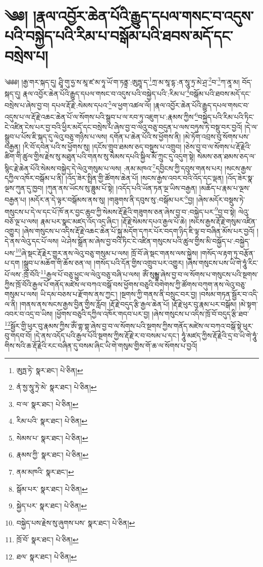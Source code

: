 \setcounter{footnote}{0} 
\chapter{༄༅། །རྣལ་འབྱོར་ཆེན་པོའི་རྒྱུད་དཔལ་གསང་བ་འདུས་པའི་བསྐྱེད་པའི་རིམ་པ་བསྒོམ་པའི་ཐབས་མདོ་དང་བསྲེས་པ།}༄༅༅། །རྒྱ་གར་སྐད་དུ། ཤྲཱི་གུ་ཧྱ་ས་མཱ་ཛ་མ་ཧཱ་ཡོ་ག་ཏནྟྲ་:ཨུཏྤཱ་ད་\footnote{ཨུཏྤ་ཏེ་  སྣར་ཐང་།  པེ་ཅིན། }ཀྲ་མ་སཱ་དྷ་:ན་སཱུ་ཏྲ་མེ་ཤྲ་\footnote{ནཾ་སྱ་སཱུ་ཏྲེ་མེ་  སྣར་ཐང་།  པེ་ཅིན། }བ་\footnote{བ་ལ་  སྣར་ཐང་།  པེ་ཅིན། }ཀ་ནཱ་མ། བོད་སྐད་དུ། རྣལ་འབྱོར་ཆེན་པོའི་རྒྱུད་དཔལ་གསང་བ་འདུས་པའི་བསྐྱེད་པའི་:རིམ་པ་\footnote{རིམ་པའི་  སྣར་ཐང་།  པེ་ཅིན། }བསྒོམ་པའི་ཐབས་མདོ་དང་བསྲེས་པ་ཞེས་བྱ་བ། དཔལ་རྡོ་རྗེ་:སེམས་དཔའ་\footnote{སེམས་པ་  སྣར་ཐང་།  པེ་ཅིན། }ལ་ཕྱག་འཚལ་ལོ། །རྣལ་འབྱོར་ཆེན་པོའི་རྒྱུད་དཔལ་གསང་བ་འདུས་པ་ལ་རྡོ་རྗེ་འཆང་ཆེན་པོ་ལ་སོགས་པའི་སྒྲུབ་པ་ལ་རབ་ཏུ་འཇུག་པ་:རྣམས་ཀྱིས་\footnote{རྣམས་ཀྱི་  སྣར་ཐང་།  པེ་ཅིན། }བསྐྱེད་པའི་རིམ་པའི་ཏིང་ངེ་འཛིན་ངེས་པར་བྱ་བའི་ཕྱིར་མདོ་དང་བསྲེས་པ་ཞེས་བྱ་བ་ལེའུ་བཅུ་བདུན་པ་ལས་བཏུས་ཏེ་བསྡུ་བར་བྱའོ། །དེ་ལ་སྒྲུབ་པ་པོས་ཇི་སྐད་དུ་ལེའུ་བཅུ་གཉིས་པ་ལས། དགོན་པ་ཆེན་པོའི་ས་ཕྱོགས་ནི། །མེ་ཏོག་འབྲས་བུ་སོགས་པས་བརྒྱན། །རི་བོ་དབེན་པའི་ས་ཕྱོགས་སུ། །དངོས་གྲུབ་ཐམས་ཅད་བསྡུས་པ་འགྲུབ། །ཅེས་བྱ་བ་ལ་སོགས་པ་རྡོ་རྗེའི་ཚིག་གི་ཚུལ་གྱིས་རྗེས་སུ་མཐུན་པའི་གནས་སུ་སེམས་དཔའི་སྐྱིལ་མོ་ཀྲུང་དུ་འདུག་སྟེ། སེམས་ཅན་ཐམས་ཅད་ལ་སྙིང་རྗེ་ཆེན་པོའི་སེམས་བསྐྱེད་དེ་ལེའུ་གསུམ་པ་ལས། :ནམ་མཁའ་\footnote{ནམ་མཁའི་  སྣར་ཐང་། }དབྱིངས་ཀྱི་དབུས་གནས་པར། །སངས་རྒྱས་དཀྱིལ་འཁོར་བསྒོམ་པ་ནི། །འོད་ཟེར་སྤྲིན་གྱི་ཚོགས་ཆེན་པོ། །སངས་རྒྱས་འབར་བའི་འོད་དང་ལྡན། །འོད་ཟེར་སྣ་ལྔས་ཀུན་དུ་ཁྱབ། །ཀུན་ནས་ཡོངས་སུ་ཟླུམ་པོ་སྟེ། །འདོད་པའི་ཡོན་ཏན་ལྔ་ཡིས་བརྒྱན། །མཆོད་པ་རྣམ་པ་ལྔས་བརྒྱན་པ། །མདོར་ན་དེ་ལྟར་བསྒོམས་ནས་སུ། །གཟུགས་ནི་དབུས་སུ་:བསྒོམ་པར་\footnote{སྒོམ་པར་  སྣར་ཐང་།  པེ་ཅིན། }བྱ། །ཞེས་མདོར་བསྡུས་ཏེ་གསུངས་པ་དེ་ལ་དང་པོ་ཁོ་ནར་བྱང་ཆུབ་ཀྱི་སེམས་རྡོ་རྗེའི་གཟུགས་ཅན་ཞེས་བྱ་བ་:བསྐྱེད་པར་\footnote{སྐྱེད་པར་  སྣར་ཐང་།  པེ་ཅིན། }བྱ་བ་སྟེ། ལེའུ་བཅོ་ལྔ་པ་ལས། རྣམ་པར་སྣང་མཛད་འོད་འདྲ་ཞིང་། །རྡོ་རྗེ་སེམས་དཔའ་རྒྱལ་པོ་ཆེ། །སངས་རྒྱས་རྡོ་རྗེ་གསུམ་འཛིན་འགྱུར། །ཞེས་གསུངས་པ་འདིས་རྡོ་རྗེ་འཆང་ཆེན་པོ་སྐུ་མདོག་དཀར་པོར་བདག་ཉིད་ཇི་ལྟ་བ་བཞིན་མོས་པར་བྱའོ། །དེ་ནས་ལེའུ་དང་པོ་ལས། ཡེ་ཤེས་སྒྲོན་མ་ཞེས་བྱ་བའི་ཏིང་ངེ་འཛིན་གསུངས་པའི་ཚུལ་གྱིས་མི་བསྐྱོད་པ་:བསྐྱེད་པས་\footnote{བསྐྱེད་པས་རྗེས་སུ་ཞུགས་པས་  སྣར་ཐང་།  པེ་ཅིན། }ཞེ་སྡང་རྡོ་རྗེར་གྱུར་ནས་ལེའུ་བཅུ་གསུམ་པ་ལས། ཁྲོ་བོ་ཞེ་སྡང་གནས་ལས་སྐྱེས། །གསོད་ལ་རྟག་ཏུ་བརྩོན་པ་དག །སྒྲུབ་པ་མཆོག་གི་ཆོས་ཅན་ལ། །གསོད་པའི་དོན་གྱིས་འགྲུབ་པར་འགྱུར། །ཞེས་གསུངས་པས་ཡི་གེ་ཧཱུཾ་རིང་པོ་ལས་:ཁྲོ་བོའི་\footnote{ཁྲོ་བོ་  སྣར་ཐང་།  པེ་ཅིན། }རྒྱལ་པོ་བཅུ་ཕྱུང་ལ་ལེའུ་བཅུ་བཞི་པ་ལས། ཨོཾ་སུམྦྷ་ཞེས་བྱ་བ་ལ་སོགས་པ་གསུངས་པའི་སྔགས་ཀྱིས་ཁྲོ་བོའི་རྒྱལ་པོ་གནོད་མཛེས་ལ་བཀའ་བསྒོ་བས་ཕྱོགས་བཅུའི་བགེགས་ཀྱི་ཚོགས་བཀུག་ནས་ལེའུ་བཅུ་གསུམ་པ་ལས། ཡི་དམ་བཅས་པ་རྫོགས་ནས་ཀྱང་། །སྔགས་ཀྱི་གནས་ནི་བསྲུང་བར་བྱ། །བསམ་གཏན་སྦྱོར་བ་འདི་ལ་ནི། །གནས་ནས་སངས་རྒྱས་བྱིན་གྱིས་རློབ། །རྡོ་རྗེ་བདུད་རྩི་རྒྱལ་ཆེན་པོ། །རྡོ་རྗེ་ཕུར་བུ་རྣམ་པར་བསྒོམ། །མེ་སྟག་འབར་བ་འདྲ་བ་ཡིས། །ཕྱོགས་བཅུའི་དཀྱིལ་འཁོར་གདབ་པར་བྱ། །ཞེས་གསུངས་པ་འདིས་ཁྲོ་བོ་བདུད་རྩི་ཐབ་\footnote{ཐལ་  སྣར་ཐང་།  པེ་ཅིན། }སྦྱོར་གྱི་ཕུར་བུ་རྣམས་ཀྱིས་ཨོཾ་གྷ་གྷ་ཞེས་བྱ་བ་ལ་སོགས་པའི་སྔགས་ཀྱིས་གནོད་མཛེས་ལ་བཀའ་བསྒོ་སྟེ་ཕུར་བུ་གདབ་བོ། །དེ་ནས་འདོད་པའི་རྒྱལ་པོའི་སྔགས་ཀྱིས་རྡོ་རྗེ་ར་བ་བསམ་པ་དང་། ཧཱུཾ་མཛད་ཀྱིས་རྡོ་རྗེའི་དྲ་བ་ཡི་གེ་ཧཱུཾ་གིས་སའི་ཆ་རྡོ་རྗེའི་རང་བཞིན་དུ་བསམ་ཞིང་ཡི་གེ་གསུམ་གྱིས་གོ་ཆ་ལ་སོགས་པ་བྱའོ། 